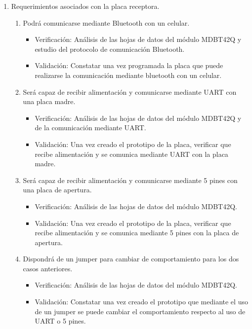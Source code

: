 \documentclass[11pt]{charter}
\begin{document}
\begin{enumerate}
\item Requerimientos asociados con la placa receptora.
	\begin{enumerate}
	\item Podrá comunicarse mediante Bluetooth con un celular.
		\begin{itemize}
		\item Verificación: Análisis de las hojas de datos del módulo MDBT42Q y estudio del protocolo de comunicación Bluetooth. 
		\item Validación: Constatar una vez programada la placa que puede realizarse la comunicación mediante bluetooth con un celular.
		\end{itemize}

	\item Será capaz de recibir alimentación y comunicarse mediante UART con una placa madre.
		\begin{itemize}
		\item Verificación: Análisis de las hojas de datos del módulo MDBT42Q y de la comunicación mediante UART. 
		\item Validación: Una vez creado el prototipo de la placa, verificar que recibe alimentación y se comunica mediante UART con la placa madre.
		\end{itemize}

	\item Será capaz de recibir alimentación y comunicarse mediante 5 pines con una placa de apertura.
		\begin{itemize}
		\item Verificación: Análisis de las hojas de datos del módulo MDBT42Q.
		\item Validación: Una vez creado el prototipo de la placa, verificar que recibe alimentación y se comunica mediante 5 pines con la placa de apertura.
		\end{itemize}
	
	\item Dispondrá de un jumper para cambiar de comportamiento para los dos casos anteriores.
		\begin{itemize}
		\item Verificación: Análisis de las hojas de datos del módulo MDBT42Q.
		\item Validación: Constatar una vez creado el prototipo que mediante el uso de un jumper se puede cambiar el comportamiento respecto al uso de UART o 5 pines.
		\end{itemize}
	

\end{enumerate}
\end{enumerate}
\end{document}

